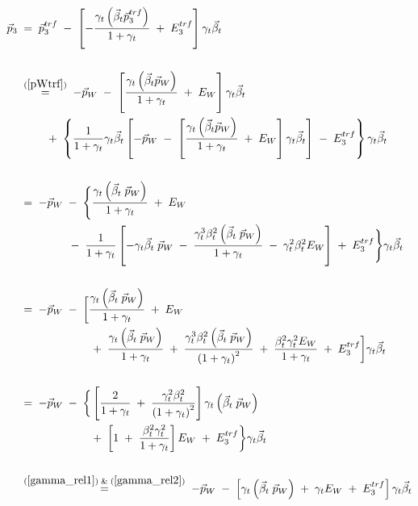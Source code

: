 \documentclass[
a4paper,                                %
twoside,                                %
BCOR1.4cm,                      %
ngerman,                                %
10pt,                           %
headings=normal,                %
headsepline,                    %
clearplainpage, %
final,                                  %
div=14,
parskip=full
]{scrbook}
\begin{document}
\begin{align}
	\vec{p}_{3}
\;&=\;
	\vec{p}_{3}^{trf}\;-\;
	\left[-\dfrac{\gamma_{t} \left(\vec{\beta}_{t} \vec{p}_{3}^{trf}\right)}
	{1 + \gamma_{t}}
	\;+\;E_{3}^{trf} \right] \gamma_{t} \vec{\beta}_{t}
\nonumber
\\
\nonumber
\\
\;&\stackrel{\mathrm{(\ref{pWtrf})}}=\;
	-\vec{p}_{W}\;-\;\left[
		\dfrac{\gamma_{t} \left(\vec{\beta}_{t} \vec{p}_{W}\right)}{1 + \gamma_{t}}
		\;+\;E_{W} 
	\right] \gamma_{t} \vec{\beta}_{t}
\nonumber
\\
&\qquad\;+\;
	\left\{
		\dfrac{1}{1 + \gamma_{t}} \gamma_{t} \vec{\beta}_{t} \left[
				-\vec{p}_{W}\;-\;\left[
					\dfrac{\gamma_{t} \left(\vec{\beta}_{t} \vec{p}_{W}\right)}
					{1 + \gamma_{t}}
					\;+\;E_{W}
				\right] \gamma_{t} \vec{\beta}_{t} 
			\right]
		\;-\;E_{3}^{trf}
	\right\} \gamma_{t} \vec{\beta}_{t}
\nonumber
\\
\nonumber
\\
\;&=\;
	-\vec{p}_{W}\;-\;
	\Bigg\{\dfrac{\gamma_{t}\left(\vec{\beta}_{t}\;\vec{p}_{W}\right)}
		{1 + \gamma_{t}}
		\;+\;E_{W}
\nonumber
\\
&\qquad\qquad\;-\;
		\dfrac{1}{1 + \gamma_{t}}\left[ 
			-\gamma_{t} \vec{\beta}_{t}\;\vec{p}_{W}\;-\;
			\dfrac{\gamma_{t}^{3} \beta_{t}^{2} 
			\left(\vec{\beta}_{t}\;\vec{p}_{W}\right)}
			{1 + \gamma_{t}}
			\;-\;\gamma_{t}^{2} \beta_{t}^{2} E_{W} 
		\right]
		\;+\;E_{3}^{trf}
	\Bigg\} \gamma_{t} \vec{\beta}_{t}
\nonumber
\\
\nonumber
\\
\;&=\;
	-\vec{p}_{W}\;-\;\bigg[
		\dfrac{\gamma_{t}\left(\vec{\beta}_{t}\;\vec{p}_{W}\right)}
		{1 + \gamma_{t}}\;+\;E_{W}
\nonumber
\\
&\qquad\qquad\qquad\;+\;
		\dfrac{\gamma_{t} \left(\vec{\beta}_{t}\;\vec{p}_{W}\right)}
		{1 + \gamma_{t}}
		\;+\;\dfrac{\gamma_{t}^{3} \beta_{t}^{2} 
		\left(\vec{\beta}_{t}\;\vec{p}_{W}\right)}
		{\left(1 + \gamma_{t}\right)^{2}}
		\;+\;\dfrac{\beta_{t}^{2} \gamma_{t}^{2} E_{W}}{1 + \gamma_{t}}
		\;+\;E_{3}^{trf}
	\bigg]\gamma_{t} \vec{\beta}_{t}
\nonumber
\\
\nonumber
\\
\;&=\;
	-\vec{p}_{W}\;-\;\bigg\{
		\left[\dfrac{2}{1 + \gamma_{t}}
			\;+\;\dfrac{\gamma_{t}^{2} \beta_{t}^{2}}
			{\left(1 + \gamma_{t}\right)^{2}}
		\right]\gamma_{t}\left(\vec{\beta}_{t}\;\vec{p}_{W}\right)
\nonumber
\\
&\qquad\qquad\qquad\;+\;
		\left[
			1\;+\;\dfrac{\beta_{t}^{2} \gamma_{t}^{2}}{1 + \gamma_{t}}
		\right] E_{W}\;+\;E_{3}^{trf}
	\bigg\}\gamma_{t} \vec{\beta}_{t}
\nonumber
\\
\nonumber
\\
\;&\stackrel{\mathrm{(\ref{gamma_rel1})\;\&\;(\ref{gamma_rel2}})}=\;
	-\vec{p}_{W}\;-\;\left[
		\gamma_{t} \left(\vec{\beta}_{t}\;\vec{p}_{W}\right)
		\;+\;\gamma_{t} E_{W}\;+\;E_{3}^{trf}
	\right]\gamma_{t} \vec{\beta}_{t}
\\
\nonumber
\end{align}
\end{document}
